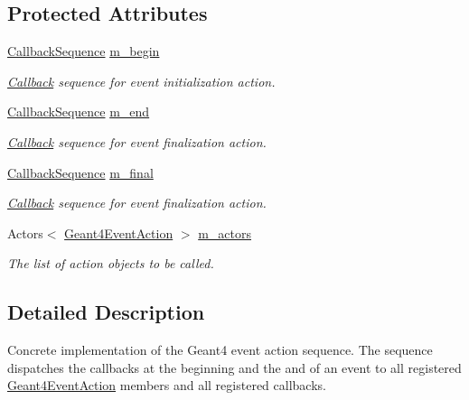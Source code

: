 \subsection*{Protected Attributes}
\begin{DoxyCompactItemize}
\item 
\hyperlink{struct_d_d4hep_1_1_callback_sequence}{CallbackSequence} \hyperlink{class_d_d4hep_1_1_simulation_1_1_geant4_event_action_sequence_a59a49de5aff7aac8379f5325e2584ad6}{m\_\-begin}
\begin{DoxyCompactList}\small\item\em \hyperlink{class_d_d4hep_1_1_callback}{Callback} sequence for event initialization action. \item\end{DoxyCompactList}\item 
\hyperlink{struct_d_d4hep_1_1_callback_sequence}{CallbackSequence} \hyperlink{class_d_d4hep_1_1_simulation_1_1_geant4_event_action_sequence_ae633e2bffea90162cc1081deca8c395c}{m\_\-end}
\begin{DoxyCompactList}\small\item\em \hyperlink{class_d_d4hep_1_1_callback}{Callback} sequence for event finalization action. \item\end{DoxyCompactList}\item 
\hyperlink{struct_d_d4hep_1_1_callback_sequence}{CallbackSequence} \hyperlink{class_d_d4hep_1_1_simulation_1_1_geant4_event_action_sequence_af2e1129997fe4ef05c0bf2e16f29cbca}{m\_\-final}
\begin{DoxyCompactList}\small\item\em \hyperlink{class_d_d4hep_1_1_callback}{Callback} sequence for event finalization action. \item\end{DoxyCompactList}\item 
Actors$<$ \hyperlink{class_d_d4hep_1_1_simulation_1_1_geant4_event_action}{Geant4EventAction} $>$ \hyperlink{class_d_d4hep_1_1_simulation_1_1_geant4_event_action_sequence_a6b3b349d21a34103e1e070a6488bb0e5}{m\_\-actors}
\begin{DoxyCompactList}\small\item\em The list of action objects to be called. \item\end{DoxyCompactList}\end{DoxyCompactItemize}


\subsection{Detailed Description}
Concrete implementation of the Geant4 event action sequence. The sequence dispatches the callbacks at the beginning and the and of an event to all registered \hyperlink{class_d_d4hep_1_1_simulation_1_1_geant4_event_action}{Geant4EventAction} members and all registered callbacks.

